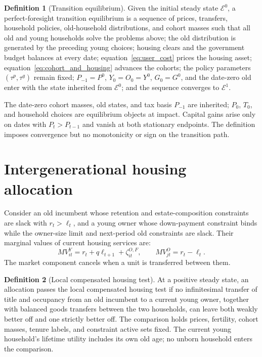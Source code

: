 \documentclass[10pt]{article}
\theoremstyle{definition}
\newtheorem{definition}{Definition}
\begin{document}
\begin{definition}[Transition equilibrium]
Given the initial steady state $\mathcal E^0$, a perfect-foresight transition
equilibrium is a sequence of prices, transfers, household policies,
old-household distributions, and cohort masses such that all old and young
households solve the problems above; the old distribution is generated by the
preceding young choices; housing clears and the government budget balances at
every date; equation~\eqref{eq:user_cost} prices the housing asset;
equation~\eqref{eq:cohort_and_housing} advances the cohorts; the policy
parameters $(\tau^p,\tau^g)$ remain fixed; $P_{-1}=P^0$,
$Y_0=O_0=Y^0$, $G_0=G^0$, and the date-zero old enter with the state inherited from
$\mathcal E^0$; and the sequence converges to $\mathcal E^1$.
\end{definition}
The date-zero cohort masses, old states, and tax basis $P_{-1}$ are inherited;
$P_0$, $T_0$, and household choices are equilibrium objects at impact. Capital
gains arise only on dates with $P_t>P_{t-1}$ and vanish at both stationary
endpoints. The definition imposes convergence but no monotonicity or sign on
the transition path.

\section{Intergenerational housing allocation}

Consider an old incumbent whose retention and estate-composition constraints
are slack with $r_t>\ell_t$, and a young owner whose down-payment constraint
binds while the owner-size limit and next-period old constraints are slack.
Their marginal values of current housing services are:
\begin{equation}
 MV_{it}^Y=r_t+q\ell_{t+1}+\zeta_{it}^{O,F},
 \qquad
 MV_{jt}^O=r_t-\ell_t.
 \label{eq:two_marginal_values}
\end{equation}
The market component cancels when a unit is transferred between them.

\begin{definition}[Local compensated housing test]
At a positive steady state, an allocation passes the local compensated housing
test if no infinitesimal transfer of title and occupancy from an old incumbent
to a current young owner, together with balanced goods transfers between the
two households, can leave both weakly better off and one strictly better off.
The comparison holds prices, fertility, cohort masses, tenure labels, and
constraint active sets fixed. The current young household's lifetime utility
includes its own old age; no unborn household enters the comparison.
\end{definition}
\end{document}
